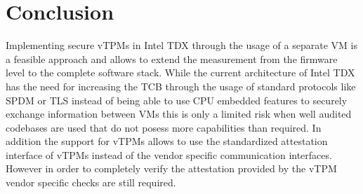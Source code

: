\documentclass[sigplan,screen,nonacm]{acmart}
\begin{document}
\section{Conclusion}
Implementing secure vTPMs in Intel TDX through the usage of a separate VM is a feasible approach and allows to extend the measurement from the firmware level to the complete software stack.
While the current architecture of Intel TDX has the need for increasing the TCB through the usage of standard protocols like SPDM or TLS instead of being able to use CPU embedded features to securely exchange information between VMs this is only a limited risk when well audited codebases are used that do not posess more capabilities than required.
In addition the support for vTPMs allows to use the standardized attestation interface of vTPMs instead of the vendor specific communication interfaces.
However in order to completely verify the attestation provided by the vTPM vendor specific checks are still required.



\end{document}
